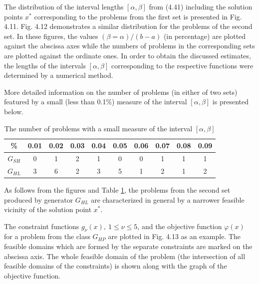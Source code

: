 \documentclass[graybox]{svmult}
\begin{document}
The distribution of the interval lengths $[\alpha,\beta]$ from (4.41) including the solution points $x^*$ corresponding to the problems from the first set is presented in Fig. 4.11. Fig. 4.12 demonstrates a similar distribution for the problems of the second set. In these figures, the values $(\beta=\alpha)/(b-a)$ (in percentage) are plotted against the abscissa axes while the numbers of problems in the corresponding sets are plotted against the ordinate ones. In order to obtain the discussed estimates, the lengths of the intervals $[\alpha,\beta]$ corresponding to the respective functions were determined by a numerical method.

More detailed information on the number of problems (in either of two sets) featured by a small (less than 0.1\%) measure of the interval $[\alpha,\beta]$ is presented below.

\begin{table}
  \caption{The number of problems with a small measure of the interval $[\alpha,\beta]$}
\begin{center}
  \label{tab4:exp_results2}
  \begin{tabular}{| c | c | c | c| c | c | c | c | c| c |}
    \hline
    \% & 0.01 & 0.02 & 0.03 & 0.04 & 0.05 & 0.06 & 0.07 & 0.08 & 0.09 \\ \hline
    $G_{SH}$ & 0 & 1 & 2 & 1 & 0 & 0 & 1 & 1 & 1  \\ \hline
    $G_{HL}$ & 3 & 6 & 2 & 3 & 5 & 1 & 2 & 1 & 2 \\ \hline
  \end{tabular}
\end{center}
\end{table}

As follows from the figures and Table \ref{tab4:exp_results2}, the problems from the second set produced by generator $G_{HL}$ are characterized in general by a narrower feasible vicinity of the solution point $x^*$.

The constraint functions $g_\nu( x ),\: 1 \le\nu\le 5$, and the objective function $\varphi (x)$ for a problem from the class $G_{HP}$ are plotted in Fig. 4.13 as an example. The feasible domains which are formed by the separate constraints are marked on the abscissa axis. The whole feasible domain of the problem (the intersection of all feasible domains of the constraints) is shown along with the graph of the objective function.
\end{document}
